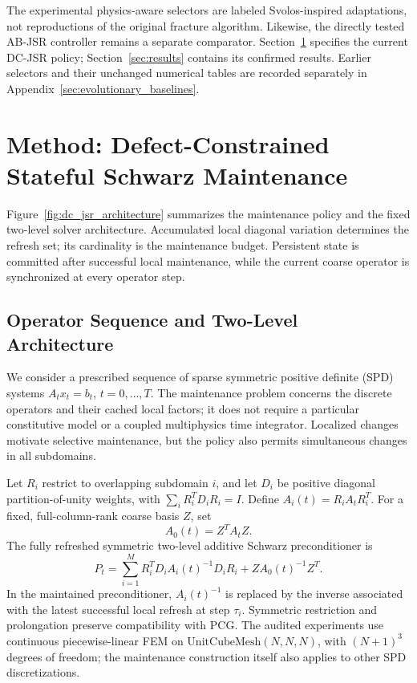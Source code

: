 \documentclass[preprint,12pt,3p]{elsarticle}
\begin{document}
The experimental physics-aware selectors are labeled Svolos-inspired
adaptations, not reproductions of the original fracture algorithm. Likewise,
the directly tested AB-JSR controller remains a separate comparator.
Section~\ref{sec:method} specifies the current DC-JSR policy;
Section~\ref{sec:results} contains its confirmed results. Earlier selectors and
their unchanged numerical tables are recorded separately in
Appendix~\ref{sec:evolutionary_baselines}.

\section{Method: Defect-Constrained Stateful Schwarz Maintenance}
\label{sec:method}

Figure~\ref{fig:dc_jsr_architecture} summarizes the maintenance policy and
the fixed two-level solver architecture. Accumulated local diagonal variation
determines the refresh set; its cardinality is the maintenance budget.
Persistent state is committed after successful local maintenance, while
the current coarse operator is synchronized at every operator step.

\subsection{Operator Sequence and Two-Level Architecture}
We consider a prescribed sequence of sparse symmetric positive definite (SPD)
systems $A_t x_t=b_t$, $t=0,\ldots,T$. The maintenance problem concerns the
discrete operators and their cached local factors; it does not require a
particular constitutive model or a coupled multiphysics time integrator.
Localized changes motivate selective maintenance, but the policy also permits
simultaneous changes in all subdomains.

Let $R_i$ restrict to overlapping subdomain $i$, and let $D_i$ be positive
diagonal partition-of-unity weights, with
$\sum_i R_i^T D_i R_i=I$. Define $A_i(t)=R_i A_t R_i^T$.
For a fixed, full-column-rank coarse basis $Z$, set
\begin{equation}
A_0(t)=Z^T A_t Z.
\label{eq:dc_coarse_operator}
\end{equation}
The fully refreshed symmetric two-level additive Schwarz preconditioner is
\begin{equation}
P_t=\sum_{i=1}^M R_i^T D_i A_i(t)^{-1}D_i R_i
       +Z A_0(t)^{-1}Z^T.
\label{eq:two_level_prec}
\end{equation}
In the maintained preconditioner, $A_i(t)^{-1}$ is replaced by the inverse
associated with the latest successful local refresh at step $\tau_i$.
Symmetric restriction and prolongation preserve compatibility with PCG.
The audited experiments use continuous piecewise-linear FEM on
$\mathrm{UnitCubeMesh}(N,N,N)$, with $(N+1)^3$ degrees of freedom;
the maintenance construction itself also applies to other SPD discretizations.
\end{document}
